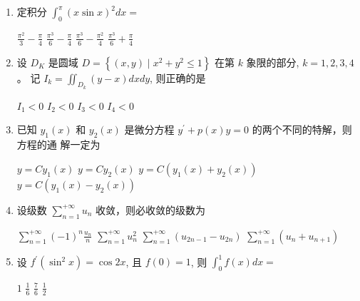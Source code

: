 \begin{enumerate}
\begin{enumerate}
\item
定积分 $\int_{0}^{\pi}(x \sin x)^{2} d x=$ 


\fourchoices
{$\frac{\pi^{2}}{3}-\frac{\pi}{4}$}
{$\frac{\pi^{3}}{6}-\frac{\pi}{4}$}
{$\frac{\pi^{3}}{6}-\frac{\pi^{2}}{4}$}
{$\frac{\pi^{3}}{6}+\frac{\pi}{4}$}

\item
设 $D_{K}$ 是圆域 $D=\left\{(x, y) \mid x^{2}+y^{2} \leqslant 1\right\}$ 在第 $k$ 象限的部分, $k=1,2,3,4$ 。 记 $I_{k}=\iint_{D_{k}}(y-x) d x d y$, 则正确的是 


\fourchoices
{$I_{1}<0$}
{$I_{2}<0$}
{$I_{3}<0$}
{$I_{4}<0$}

\item
已知 $y_{1}(x)$ 和 $y_{2}(x)$ 是微分方程 $y^{\prime}+p(x) y=0$ 的两个不同的特解，则方程的通 解一定为 


\fourchoices
{$y=C y_{1}(x)$}
{$y=Cy_{2}(x)$}
{$y=C\left(y_{1}(x)+y_{2}(x)\right)$}
{$y=C\left(y_{1}(x)-y_{2}(x)\right)$}

\item
设级数 $\sum\limits_{n=1}^{+\infty} u_{n}$ 收敛，则必收敛的级数为 


\fourchoices
{$\sum\limits_{n=1}^{+\infty}(-1)^{n} \frac{u_{n}}{n}$}
{$\sum\limits_{n=1}^{+\infty} u_{n}^{2}$}
{$\sum\limits_{n=1}^{+\infty}\left(u_{2 n-1}-u_{2 n}\right)$}
{$\sum\limits_{n=1}^{+\infty}\left(u_{n}+u_{n+1}\right)$}

\item
设 $f^{\prime}\left(\sin ^{2} x\right)=\cos 2 x$, 且 $f(0)=1$, 则 $\int_{0}^{1} f(x) d x=$ 


\fourchoices
{$ 1 $}
{$\frac{1}{6}$}
{$\frac{7}{6}$}
{$\frac{1}{2}$}



\end{enumerate}


\end{enumerate}
